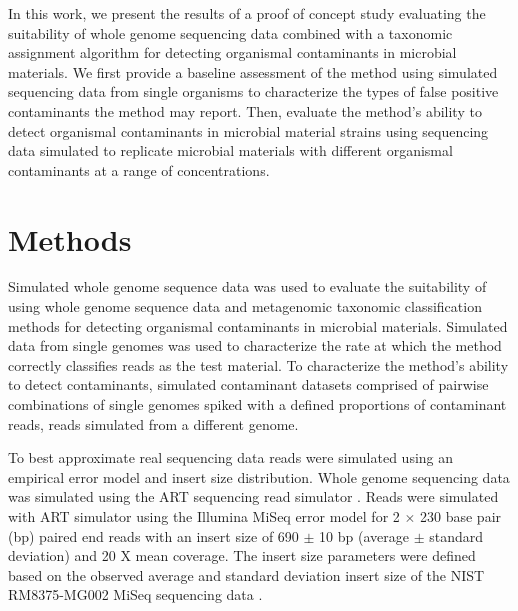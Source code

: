 \documentclass[fleqn,10pt,lineno]{wlpeerj}\usepackage[]{graphicx}\usepackage[]{color}
\begin{document}
In this work, we present the results of a proof of concept study evaluating the suitability of whole genome sequencing data combined with a taxonomic assignment algorithm for detecting organismal contaminants in microbial materials.
We first provide a baseline assessment of the method using simulated sequencing data from single organisms to characterize the types of false positive contaminants the method may report.
Then, evaluate the method's ability to detect organismal contaminants in microbial material strains using sequencing data simulated to replicate microbial materials with different organismal contaminants at a range of concentrations.

\section*{Methods}
Simulated whole genome sequence data was used to evaluate the suitability of using whole genome sequence data and metagenomic taxonomic classification methods for detecting organismal contaminants in microbial materials.
Simulated data from single genomes was used to characterize the rate at which the method correctly classifies reads as the test material.
To characterize the method's ability to detect contaminants, simulated contaminant datasets comprised of pairwise combinations of single genomes spiked with a defined proportions of contaminant reads, reads simulated from a different genome.

To best approximate real sequencing data reads were simulated using an empirical error model and insert size distribution.
Whole genome sequencing data was simulated using the ART sequencing read simulator \citep{Huang2012}.
Reads were simulated with ART simulator using the Illumina MiSeq error model for 2 $\times$ 230 base pair (bp) paired end reads with an insert size of 690 $\pm$ 10 bp (average $\pm$ standard deviation) and 20 X mean coverage.
The insert size parameters were defined based on the observed average and standard deviation insert size of the NIST RM8375-MG002 MiSeq sequencing data \citep{olson2016pepr}.
\end{document}
